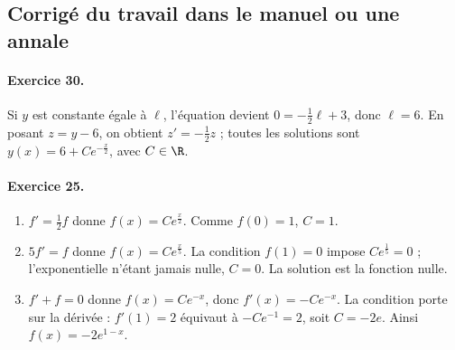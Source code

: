 \subsection{Corrigé du travail dans le manuel ou une annale}\paragraph{Exercice 30.} Si $y$ est constante égale à $\ell$, l'équation devient $0=-\frac12\ell+3$, donc $\ell=6$. En posant $z=y-6$, on obtient $z'=-\frac12z$ ; toutes les solutions sont $y(x)=6+Ce^{-\frac x2}$, avec $C\in\R$.
\paragraph{Exercice 25.}
\begin{enumerate}
\item $f'=\frac12f$ donne $f(x)=Ce^{\frac x2}$. Comme $f(0)=1$, $C=1$.
\item $5f'=f$ donne $f(x)=Ce^{\frac x5}$. La condition $f(1)=0$ impose $Ce^{\frac15}=0$ ; l'exponentielle n'étant jamais nulle, $C=0$. La solution est la fonction nulle.
\item $f'+f=0$ donne $f(x)=Ce^{-x}$, donc $f'(x)=-Ce^{-x}$. La condition porte sur la dérivée : $f'(1)=2$ équivaut à $-Ce^{-1}=2$, soit $C=-2e$. Ainsi $f(x)=-2e^{1-x}$.
\end{enumerate}

\fi

